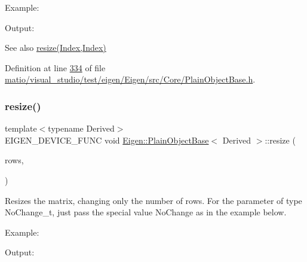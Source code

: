 Example\+: 
\begin{DoxyCodeInclude}
\end{DoxyCodeInclude}
 Output\+: 
\begin{DoxyVerbInclude}
\end{DoxyVerbInclude}


\begin{DoxySeeAlso}{See also}
\hyperlink{class_eigen_1_1_plain_object_base_a99d9054ee2d5a40c6e00ded0265e9cea}{resize(\+Index,\+Index)} 
\end{DoxySeeAlso}


Definition at line \hyperlink{matio_2visual__studio_2test_2eigen_2_eigen_2src_2_core_2_plain_object_base_8h_source_l00334}{334} of file \hyperlink{matio_2visual__studio_2test_2eigen_2_eigen_2src_2_core_2_plain_object_base_8h_source}{matio/visual\+\_\+studio/test/eigen/\+Eigen/src/\+Core/\+Plain\+Object\+Base.\+h}.

\mbox{\label{class_eigen_1_1_plain_object_base_a7b44761b7350ae3756035bbf7d7c04f6}} 
\subsubsection{\texorpdfstring{resize()}{resize()}\hspace{0.1cm}{\footnotesize\ttfamily [7/8]}}
{\footnotesize\ttfamily template$<$typename Derived$>$ \\
E\+I\+G\+E\+N\+\_\+\+D\+E\+V\+I\+C\+E\+\_\+\+F\+U\+NC void \hyperlink{class_eigen_1_1_plain_object_base}{Eigen\+::\+Plain\+Object\+Base}$<$ Derived $>$\+::resize (\begin{DoxyParamCaption}\item[{\hyperlink{namespace_eigen_a62e77e0933482dafde8fe197d9a2cfde}{Index}}]{rows,  }\item[{No\+Change\+\_\+t}]{ }\end{DoxyParamCaption})\hspace{0.3cm}{\ttfamily [inline]}}

Resizes the matrix, changing only the number of rows. For the parameter of type No\+Change\+\_\+t, just pass the special value {\ttfamily No\+Change} as in the example below.

Example\+: 
\begin{DoxyCodeInclude}
\end{DoxyCodeInclude}
 Output\+: 
\begin{DoxyVerbInclude}
\end{DoxyVerbInclude}


